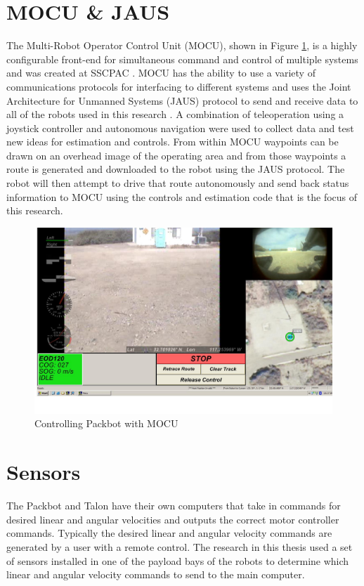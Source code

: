 \section{MOCU \& JAUS}
\label{sec:mocujaus}
The Multi-Robot Operator Control Unit (MOCU), shown in Figure \ref{fig:mocu}, is a highly configurable front-end for simultaneous command and control of multiple systems and was created at SSCPAC \cite{PowellMOCU08}. MOCU has the ability to use a variety of communications protocols for interfacing to different systems and uses the Joint Architecture for Unmanned Systems (JAUS) protocol to send and receive data to all of the robots used in this research \cite{RoweJAUS08}. A combination of teleoperation using a joystick controller and autonomous navigation were used to collect data and test new ideas for estimation and controls. From within MOCU waypoints can be drawn on an overhead image of the operating area and from those waypoints a route is generated and downloaded to the robot using the JAUS protocol. The robot will then attempt to drive that route autonomously and send back status information to MOCU using the controls and estimation code that is the focus of this research.

\begin{figure}[ht!]
	\centering
	\includegraphics[width=.75\textwidth]{images/mocuPackbotScreenshot}
	\caption{Controlling Packbot with MOCU}
	\label{fig:mocu}
\end{figure}

\section{Sensors}
\label{sec:bgSensors}
The Packbot and Talon have their own computers that take in commands for desired linear and angular velocities and outputs the correct motor controller commands. Typically the desired linear and angular velocity commands are generated by a user with a remote control. The research in this thesis used a set of sensors installed in one of the payload bays of the robots to determine which linear and angular velocity commands to send to the main computer.

